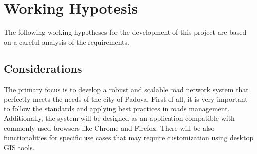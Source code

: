 \section{Working Hypotesis}
The following working hypotheses for the development of this project are based on a careful analysis of the requirements.
\subsection{Considerations}
The primary focus is to develop a robust and scalable road network system that perfectly meets the needs of the city of Padova. First of all, it is very important to follow the standards and applying best practices in roads management. Additionally, the system will be designed as an application compatible with commonly used browsers like Chrome and Firefox. There will be also functionalities for specific use cases that may require customization using desktop GIS tools.
